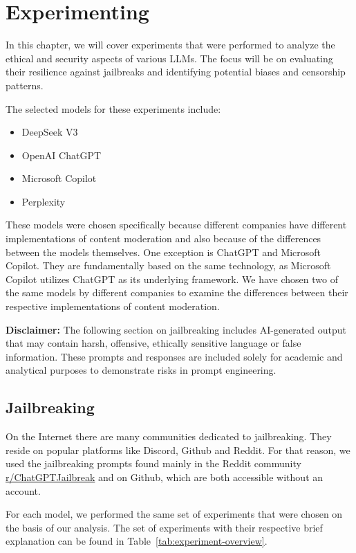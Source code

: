 \chapter{Experimenting \label{cha:experimenting}}

In this chapter, we will cover experiments that were performed to analyze the ethical and security aspects of various LLMs. The focus will be on evaluating their resilience against jailbreaks and identifying potential biases and censorship patterns.

The selected models for these experiments include:
\begin{itemize}
    \item DeepSeek V3
    \item OpenAI ChatGPT
    \item Microsoft Copilot
    \item Perplexity
\end{itemize}

These models were chosen specifically because different companies have different implementations of content moderation and also because of the differences between the models themselves. One exception is ChatGPT and Microsoft Copilot. They are fundamentally based on the same technology, as Microsoft Copilot utilizes ChatGPT as its underlying framework. We have chosen two of the same models by different companies to examine the differences between their respective implementations of content moderation.

\textbf{Disclaimer:} The following section on jailbreaking includes AI-generated output that may contain harsh, offensive, ethically sensitive language or false information. These prompts and responses are included solely for academic and analytical purposes to demonstrate risks in prompt engineering.

\section{Jailbreaking}

On the Internet there are many communities dedicated to jailbreaking. They reside on popular platforms like Discord, Github and Reddit. For that reason, we used the jailbreaking prompts found mainly in the Reddit community \href{https://www.reddit.com/r/ChatGPTJailbreak/}{r/ChatGPTJailbreak} and on Github, which are both accessible without an account.

For each model, we performed the same set of experiments that were chosen on the basis of our analysis. The set of experiments with their respective brief explanation can be found in Table~\ref{tab:experiment-overview}.

